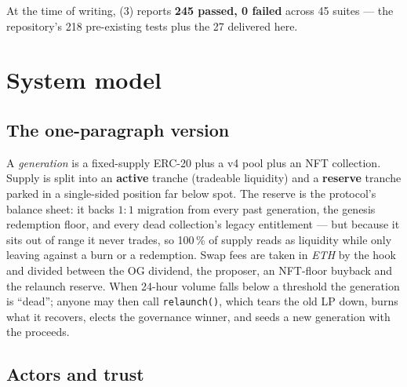 \documentclass[10pt,a4paper]{article}
\newcommand{\code}[1]{\texttt{\small #1}}
\begin{document}
\noindent At the time of writing, (3) reports \textbf{245 passed, 0 failed}
across 45 suites --- the repository's 218 pre-existing tests plus the 27
delivered here.

\section{System model}
\label{sec:model}

\subsection{The one-paragraph version}

A \emph{generation} is a fixed-supply ERC-20 plus a v4 pool plus an NFT
collection. Supply is split into an \textbf{active} tranche (tradeable
liquidity) and a \textbf{reserve} tranche parked in a single-sided position far
below spot. The reserve is the protocol's balance sheet: it backs $1{:}1$
migration from every past generation, the genesis redemption floor, and every
dead collection's legacy entitlement --- but because it sits out of range it
never trades, so 100\,\% of supply reads as liquidity while only leaving against
a burn or a redemption. Swap fees are taken in \emph{ETH} by the hook and
divided between the OG dividend, the proposer, an NFT-floor buyback and the
relaunch reserve. When 24-hour volume falls below a threshold the generation is
``dead''; anyone may then call \code{relaunch()}, which tears the old LP down,
burns what it recovers, elects the governance winner, and seeds a new
generation with the proceeds.

\subsection{Actors and trust}
\end{document}
